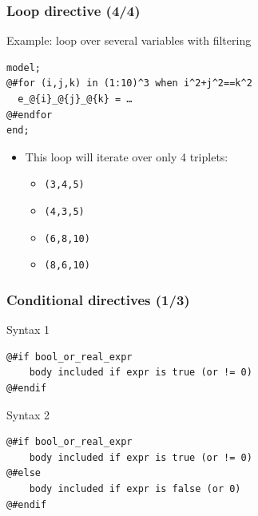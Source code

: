 \documentclass[handout,usepdftitle=false,xcolor=dvipsnames,aspectratio=169]{beamer}
\begin{document}
\begin{frame}[fragile]
  \frametitle{Loop directive (4/4)}
  \begin{block}{Example: loop over several variables with filtering}
    \small
    \begin{verbatim}
model;
@#for (i,j,k) in (1:10)^3 when i^2+j^2==k^2
  e_@{i}_@{j}_@{k} = …
@#endfor
end;
\end{verbatim}
    \normalsize
  \end{block}
  \begin{itemize}
    \item This loop will iterate over only 4 triplets:
          \begin{itemize}
            \item \texttt{(3,4,5)}
            \item \texttt{(4,3,5)}
            \item \texttt{(6,8,10)}
            \item \texttt{(8,6,10)}
          \end{itemize}

  \end{itemize}

\end{frame}

\begin{frame}[fragile]
  \frametitle{Conditional directives (1/3)}

  \begin{block}{Syntax 1}
    \begin{verbatim}
@#if bool_or_real_expr
    body included if expr is true (or != 0)
@#endif
\end{verbatim}
  \end{block}


  \begin{block}{Syntax 2}
    \begin{verbatim}
@#if bool_or_real_expr
    body included if expr is true (or != 0)
@#else
    body included if expr is false (or 0)
@#endif
\end{verbatim}
  \end{block}
\end{frame}
\end{document}
